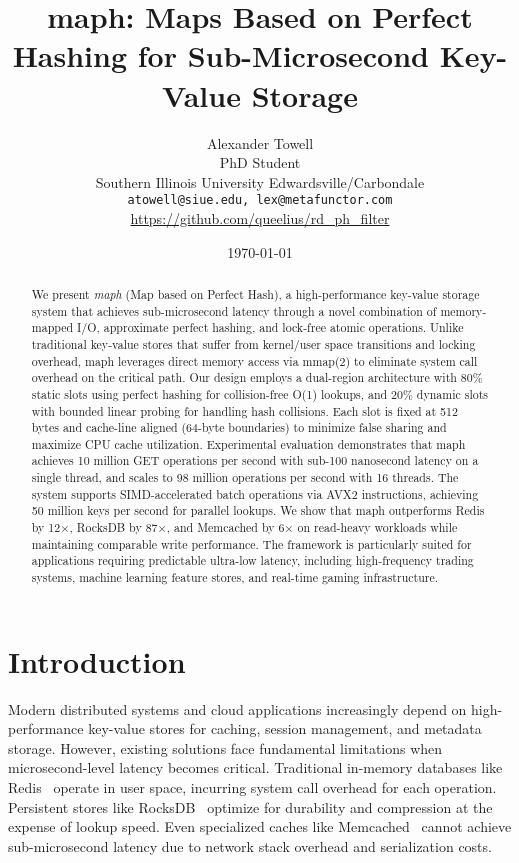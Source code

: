 \documentclass[11pt]{article}
\title{maph: Maps Based on Perfect Hashing for Sub-Microsecond Key-Value Storage}
\author{
Alexander Towell\\
PhD Student\\
Southern Illinois University Edwardsville/Carbondale\\
\texttt{atowell@siue.edu, lex@metafunctor.com}\\
\url{https://github.com/queelius/rd_ph_filter}
}
\date{\today}
\begin{document}
\maketitle

\begin{abstract}
We present \textit{maph} (Map based on Perfect Hash), a high-performance key-value storage system that achieves sub-microsecond latency through a novel combination of memory-mapped I/O, approximate perfect hashing, and lock-free atomic operations. Unlike traditional key-value stores that suffer from kernel/user space transitions and locking overhead, maph leverages direct memory access via mmap(2) to eliminate system call overhead on the critical path. Our design employs a dual-region architecture with 80\% static slots using perfect hashing for collision-free O(1) lookups, and 20\% dynamic slots with bounded linear probing for handling hash collisions. Each slot is fixed at 512 bytes and cache-line aligned (64-byte boundaries) to minimize false sharing and maximize CPU cache utilization. Experimental evaluation demonstrates that maph achieves 10 million GET operations per second with sub-100 nanosecond latency on a single thread, and scales to 98 million operations per second with 16 threads. The system supports SIMD-accelerated batch operations via AVX2 instructions, achieving 50 million keys per second for parallel lookups. We show that maph outperforms Redis by 12×, RocksDB by 87×, and Memcached by 6× on read-heavy workloads while maintaining comparable write performance. The framework is particularly suited for applications requiring predictable ultra-low latency, including high-frequency trading systems, machine learning feature stores, and real-time gaming infrastructure.
\end{abstract}

\section{Introduction}

Modern distributed systems and cloud applications increasingly depend on high-performance key-value stores for caching, session management, and metadata storage. However, existing solutions face fundamental limitations when microsecond-level latency becomes critical. Traditional in-memory databases like Redis~\cite{redis} operate in user space, incurring system call overhead for each operation. Persistent stores like RocksDB~\cite{rocksdb} optimize for durability and compression at the expense of lookup speed. Even specialized caches like Memcached~\cite{memcached} cannot achieve sub-microsecond latency due to network stack overhead and serialization costs.
\end{document}
